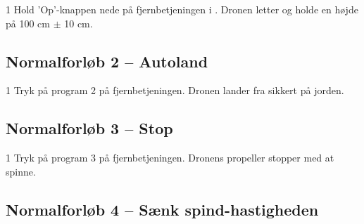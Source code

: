 \documentclass[Main]{subfiles}
\begin{document}
\begin{TestCase}
\TC
{1}
{Hold 'Op'-knappen nede på fjernbetjeningen i .}
{Dronen letter og holde en højde på 100 cm $\pm$ 10 cm.}
{}
\end{TestCase}





\subsection*{Normalforløb 2 -- Autoland}

\begin{TestCaseIntro}
\end{TestCaseIntro}

\begin{TestCase}
\TC
{1}
{Tryk på program 2 på fjernbetjeningen.}
{Dronen lander fra sikkert på jorden.}
{}
\end{TestCase}




\subsection*{Normalforløb 3 -- Stop}

\begin{TestCaseIntro}
\end{TestCaseIntro}

\begin{TestCase}
\TC
{1}
{Tryk på program 3 på fjernbetjeningen.}
{Dronens propeller stopper med at spinne.}
{}
\end{TestCase}




\newpage
\subsection*{Normalforløb 4 -- Sænk spind-hastigheden}

\begin{TestCaseIntro}
\end{TestCaseIntro}
\end{document}
